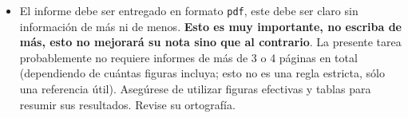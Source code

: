 \documentclass[letter, 11pt]{article}
\begin{document}
\begin{itemize}
\item El informe debe ser entregado en formato \texttt{pdf}, este debe ser
  claro sin información de más ni de menos. \textbf{Esto es muy importante, no
  escriba de más, esto no mejorará su nota sino que al contrario}. La presente
  tarea probablemente no requiere informes de más de 3 o 4 páginas en total
  (dependiendo de cuántas figuras incluya; esto no es una regla estricta, sólo
  una referencia útil).  Asegúrese de utilizar figuras efectivas y tablas para
  resumir sus resultados. Revise su ortografía.

\end{itemize}

\end{document}
